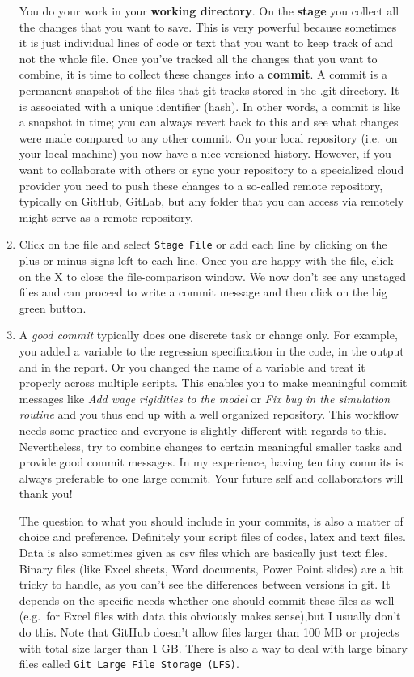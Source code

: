 \begin{enumerate}
You do your work in your \textbf{working directory}.
On the \textbf{stage} you collect all the changes that you want to save.
This is very powerful because sometimes it is just individual lines of code or text that you want to keep track of and not the whole file.
Once you've tracked all the changes that you want to combine, it is time to collect these changes into a \textbf{commit}.
A commit is a permanent snapshot of the files that git tracks stored in the {.git} directory.
It is associated with a unique identifier (hash).
In other words, a commit is like a snapshot in time; you can always revert back to this and see what changes were made compared to any other commit.
On your local repository (i.e.\ on your local machine) you now have a nice versioned history.
However, if you want to collaborate with others or sync your repository to a specialized cloud provider you need to push these changes to a so-called remote repository,
  typically on GitHub, GitLab, but any folder that you can access via remotely might serve as a remote repository.

\item
Click on the file and select \texttt{Stage File} or add each line by clicking on the plus or minus signs left to each line.
Once you are happy with the file, click on the X to close the file-comparison window.
We now don't see any unstaged files and can proceed to write a commit message and then click on the big green button.

\item
A \emph{good commit} typically does one discrete task or change only.
For example, you added a variable to the regression specification in the code, in the output and in the report.
Or you changed the name of a variable and treat it properly across multiple scripts.
This enables you to make meaningful commit messages like \emph{Add wage rigidities to the model} or \emph{Fix bug in the simulation routine}
  and you thus end up with a well organized repository.
This workflow needs some practice and everyone is slightly different with regards to this.
Nevertheless, try to combine changes to certain meaningful smaller tasks and provide good commit messages.
In my experience, having ten tiny commits is always preferable to one large commit.
Your future self and collaborators will thank you!

The question to what you should include in your commits, is also a matter of choice and preference.
Definitely your script files of codes, latex and text files.
Data is also sometimes given as csv files which are basically just text files.
Binary files (like Excel sheets, Word documents, Power Point slides) are a bit tricky to handle,
  as you can't see the differences between versions in git.
It depends on the specific needs whether one should commit these files as well (e.g.\ for Excel files with data this obviously makes sense),but I usually don't do this.
Note that GitHub doesn't allow files larger than 100 MB or projects with total size larger than 1 {GB}.
There is also a way to deal with large binary files called \texttt{Git Large File Storage (LFS)}.


\end{enumerate}
